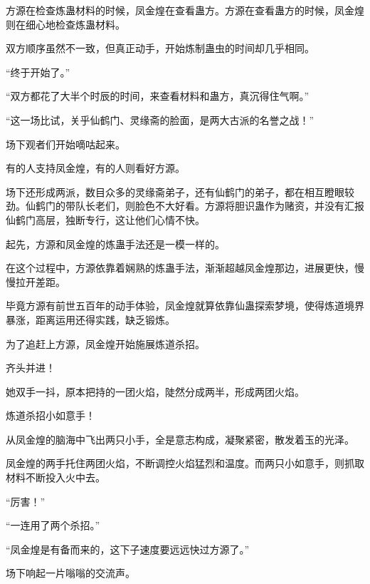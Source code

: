\begin{this_body}
方源在检查炼蛊材料的时候，凤金煌在查看蛊方。方源在查看蛊方的时候，凤金煌则在细心地检查炼蛊材料。

双方顺序虽然不一致，但真正动手，开始炼制蛊虫的时间却几乎相同。

“终于开始了。”

“双方都花了大半个时辰的时间，来查看材料和蛊方，真沉得住气啊。”

“这一场比试，关乎仙鹤门、灵缘斋的脸面，是两大古派的名誉之战！”

场下观者们开始嘀咕起来。

有的人支持凤金煌，有的人则看好方源。

场下还形成两派，数目众多的灵缘斋弟子，还有仙鹤门的弟子，都在相互瞪眼较劲。仙鹤门的带队长老们，则脸色不大好看。方源将胆识蛊作为赌资，并没有汇报仙鹤门高层，独断专行，这让他们心情不快。

起先，方源和凤金煌的炼蛊手法还是一模一样的。

在这个过程中，方源依靠着娴熟的炼蛊手法，渐渐超越凤金煌那边，进展更快，慢慢拉开差距。

毕竟方源有前世五百年的动手体验，凤金煌就算依靠仙蛊探索梦境，使得炼道境界暴涨，距离运用还得实践，缺乏锻炼。

为了追赶上方源，凤金煌开始施展炼道杀招。

齐头并进！

她双手一抖，原本把持的一团火焰，陡然分成两半，形成两团火焰。

炼道杀招小如意手！

从凤金煌的脑海中飞出两只小手，全是意志构成，凝聚紧密，散发着玉的光泽。

凤金煌的两手托住两团火焰，不断调控火焰猛烈和温度。而两只小如意手，则抓取材料不断投入火中去。

“厉害！”

“一连用了两个杀招。”

“凤金煌是有备而来的，这下子速度要远远快过方源了。”

场下响起一片嗡嗡的交流声。

\end{this_body}


